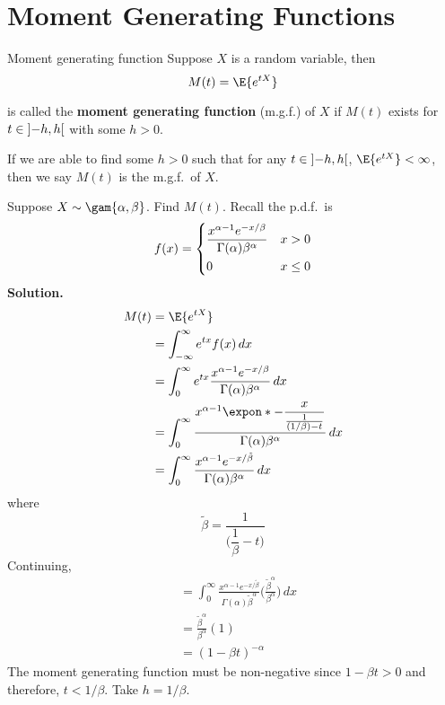 \section{Moment Generating Functions}
\begin{Definition}{Moment generating function}{}
    Suppose $ X $ is a random variable, then
    \[ M(t)=\E{e^{tX}} \]

    is called the \textbf{moment generating function} (m.g.f.) of $ X $
    if $ M(t) $ exists for $ t\in\interval[open]{-h}{h} $ with some $ h>0 $.
\end{Definition}
\begin{Remark}{}{}
    If we are able to find some $ h>0 $ such that for any
    $ t\in\interval[open]{-h}{h} $,
    $ \E{e^{tX}}<\infty $, then we
    say $ M(t) $ is the m.g.f.\ of $ X $.
\end{Remark}

\begin{Example}{}{}
    Suppose $ X \sim \gam{\alpha,\beta}$.
    Find $ M(t) $.
    Recall the p.d.f.\ is
    \[ f(x)=\begin{dcases}
            \frac{x^{\alpha-1}e^{-x/\beta}}{\Gamma(\alpha)\beta^\alpha} & x>0    \\
            0                                                           & x\le 0
        \end{dcases}
    \]
    \textbf{Solution.}
    \begin{align*}
        M(t)
         & =\E{e^{tX}}                                                                                     \\
         & =\int_{-\infty}^{\infty} e^{tx}f(x)\, d{x}                                                      \\
         & =\int_{0}^{\infty} e^{tx} \frac{x^{\alpha-1}e^{-x/\beta}}{
        \Gamma(\alpha)\beta^\alpha
        } \, d{x}                                                                                          \\
         & =\int_{0}^{\infty} \frac{x^{\alpha-1}\expon*{\displaystyle
                -\frac{x}{\frac{1}{(1/\beta)-t} }}} {
            \Gamma(\alpha)\beta^\alpha
        } \, d{x}                                                                                          \\
         & = \int_{0}^{\infty} \frac{x^{\alpha-1}e^{-x/\tilde{\beta}}}{\Gamma(\alpha)\beta^\alpha} \, d{x}
    \end{align*}
    where
    \[ \tilde{\beta}=\dfrac{1}{\biggl(\dfrac{1}{\beta}-t\biggr)}  \]
    Continuing,
    \begin{align*}
         & =\int_{0}^{\infty} \frac{x^{\alpha-1}e^{-x/\tilde{\beta}}}{\Gamma(\alpha)
        \tilde{\beta}^\alpha} \biggl( \frac{\tilde{\beta}^\alpha}{\beta^\alpha} \biggr)  \, d{x} \\
         & =\frac{\tilde{\beta}^\alpha}{\beta^\alpha}(1)                                         \\
         & =(1-\beta t)^{-\alpha}
    \end{align*}
    The moment generating function must be non-negative since
    $ 1-\beta t>0 $ and therefore, $ t<1/\beta $. Take $ h=1/\beta $.
\end{Example}

